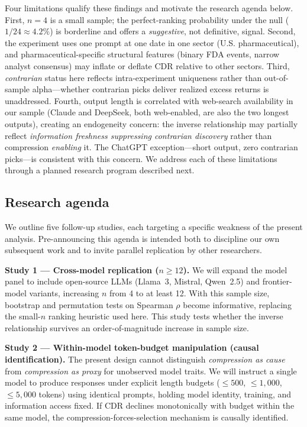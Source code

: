 \documentclass[11pt,letterpaper]{article}
\begin{document}
Four limitations qualify these findings and motivate the research agenda below. First, $n=4$ is a small sample; the perfect-ranking probability under the null ($1/24\approx 4.2\%$) is borderline and offers a \textit{suggestive}, not definitive, signal. Second, the experiment uses one prompt at one date in one sector (U.S. pharmaceutical), and pharmaceutical-specific structural features (binary FDA events, narrow analyst consensus) may inflate or deflate CDR relative to other sectors. Third, \textit{contrarian} status here reflects intra-experiment uniqueness rather than out-of-sample alpha---whether contrarian picks deliver realized excess returns is unaddressed. Fourth, output length is correlated with web-search availability in our sample (Claude and DeepSeek, both web-enabled, are also the two longest outputs), creating an endogeneity concern: the inverse relationship may partially reflect \textit{information freshness suppressing contrarian discovery} rather than compression \textit{enabling} it. The ChatGPT exception---short output, zero contrarian picks---is consistent with this concern. We address each of these limitations through a planned research program described next.

\subsection{Research agenda}

We outline five follow-up studies, each targeting a specific weakness of the present analysis. Pre-announcing this agenda is intended both to discipline our own subsequent work and to invite parallel replication by other researchers.

\textbf{Study 1 --- Cross-model replication ($n\geq 12$).} We will expand the model panel to include open-source LLMs (Llama~3, Mistral, Qwen~2.5) and frontier-model variants, increasing $n$ from 4 to at least 12. With this sample size, bootstrap and permutation tests on Spearman $\rho$ become informative, replacing the small-$n$ ranking heuristic used here. This study tests whether the inverse relationship survives an order-of-magnitude increase in sample size.

\textbf{Study 2 --- Within-model token-budget manipulation (causal identification).} The present design cannot distinguish \textit{compression as cause} from \textit{compression as proxy} for unobserved model traits. We will instruct a single model to produce responses under explicit length budgets ($\leq 500$, $\leq 1{,}000$, $\leq 5{,}000$ tokens) using identical prompts, holding model identity, training, and information access fixed. If CDR declines monotonically with budget within the same model, the compression-forces-selection mechanism is causally identified.
\end{document}
